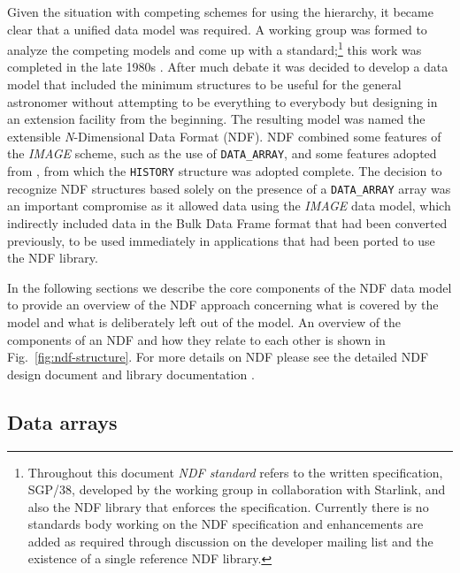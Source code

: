 \documentclass[final,authoryear,5p,times,twocolumn]{elsarticle}
\begin{document}
Given the situation with competing schemes for using the hierarchy, it
became clear that a unified data model was required. A working group
was formed to analyze the competing models and come up with a
standard;\footnote{Throughout this document \emph{NDF standard} refers
to the written specification, SGP/38, developed by the working group
in collaboration with Starlink, and also the NDF library
that enforces the specification. Currently there is no standards body
working on the NDF specification and enhancements are added as
required through discussion on the developer mailing list and
 the existence of a single reference NDF library.} this work
was completed in the late 1980s \citep{1988STARB...2...11C,SGP38}.
After much debate it was decided to develop a data model that included
the minimum structures to be useful for the general astronomer without
attempting to be everything to everybody but designing in an extension
facility from the beginning. The resulting model was named the
extensible \emph{N}-Dimensional Data Format (NDF).  NDF combined some
features of the \emph{IMAGE} scheme, such as the use of
\texttt{DATA\_ARRAY}, and some features adopted from \asterix, from
which the \texttt{HISTORY} structure was adopted complete.  The
decision to recognize NDF structures  based solely on the presence of a
\texttt{DATA\_ARRAY} array was an important compromise as it allowed
data using the \emph{IMAGE} data model, which indirectly included data in the
Bulk Data Frame \citep[BDF;][]{1980SPIE..264...70P,SUN4}
format that had been converted previously, to be used immediately
in applications that had been ported to use the NDF library.

In the following sections we describe the core components of the NDF
data model to provide an overview of the NDF approach concerning what
is covered by the model and what is deliberately left out of the
model. An overview of the components of an NDF and how they relate to
each other is shown in Fig.\ \ref{fig:ndf-structure}. For more details
on NDF please see the detailed NDF design document
\citep[SGP/38;][]{SGP38} and library documentation
\citep[SUN/33;][]{SUN33}.

\subsection{Data arrays}
\end{document}
